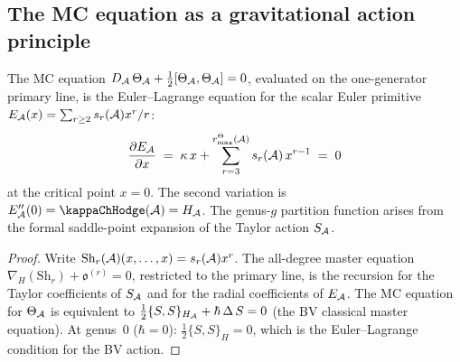 \subsection{The MC equation as a gravitational action principle}

\begin{theorem}[MC equation = Euler--Lagrange equation]
\ClaimStatusProvedHere
{}
The MC equation $D_{\mathcal{A}}\,\Theta_{\mathcal{A}} +
\frac{1}{2}[\Theta_{\mathcal{A}}, \Theta_{\mathcal{A}}] = 0$,
evaluated on the one-generator primary line, is the
Euler--Lagrange equation for the scalar Euler primitive
$E_{\mathcal{A}}(x)=\sum_{r\geq2}s_r(\mathcal{A})x^r/r$:
\begin{equation}%
\frac{\partial E_\cA}{\partial x}
\;=\;
\kappa\,x + \sum_{r=3}^{r^\Theta_{\max}(\cA)}
s_r(\cA)\,x^{r-1}
\;=\; 0
\end{equation}
at the critical point $x = 0$. The second variation is
$E''_\cA(0) = \kappaChHodge(\cA) = H_\cA$. The genus-$g$
partition function arises from the formal saddle-point
expansion of the Taylor action $S_{\mathcal{A}}$.
\end{theorem}

\begin{proof}
Write $\mathrm{Sh}_r(\mathcal{A})(x,\ldots,x)=s_r(\mathcal{A})x^r$.
The all-degree master equation
$\nabla_H(\mathrm{Sh}_r) + \mathfrak{o}^{(r)} = 0$,
restricted to the primary line, is the recursion for the
Taylor coefficients of $S_{\mathcal{A}}$ and for the radial coefficients of
$E_{\mathcal{A}}$. The MC equation for
$\Theta_{\mathcal{A}}$ is equivalent to
$\frac{1}{2}\{S, S\}_{H_{\mathcal{A}}} + \hbar\,\Delta\,S = 0$
(the BV classical master equation). At genus~$0$ ($\hbar = 0$):
$\frac{1}{2}\{S, S\}_H = 0$, which is the Euler--Lagrange
condition for the BV action.
\end{proof}

